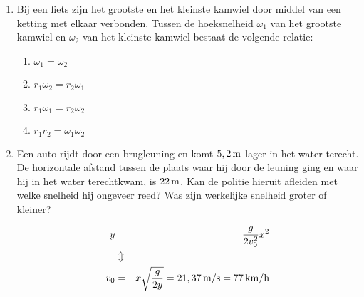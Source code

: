\begin{enumerate}
\item Bij een fiets zijn het grootste en het kleinste kamwiel door
middel van een ketting met elkaar verbonden. Tussen de hoeksnelheid
$\omega_1$ van het grootste kamwiel en $\omega_2$ van het kleinste
kamwiel bestaat de volgende relatie:
\newline
\begin{minipage}[t]{0.4\textwidth}
\begin{enumerate}
\item $\omega_1=\omega_2$
\item $r_1\omega_2=r_2\omega_1$
\item $r_1\omega_1=r_2\omega_2$
\item $r_1r_2=\omega_1\omega_2$
\end{enumerate}
\end{minipage}
\begin{minipage}[t]{0.5\textwidth}
\end{minipage}



\item Een auto rijdt door een brugleuning en komt $5,2\rm\,m$ lager in het water terecht. De horizontale afstand tussen de plaats waar hij door de leuning ging en waar hij in het water terechtkwam, is $22\rm\,m$. Kan de politie hieruit afleiden met welke snelheid hij ongeveer reed? Was zijn werkelijke snelheid groter of kleiner?
\begin{oplossing}
\begin{eqnarray*}
y&=&\frac{g}{2v_0^2}x^2\\
&\Updownarrow&\\
v_0&=&x\sqrt{\frac{g}{2y}}=21,37\rm\,m/s=77\rm\,km/h
\end{eqnarray*}
\end{oplossing}




\end{enumerate}
